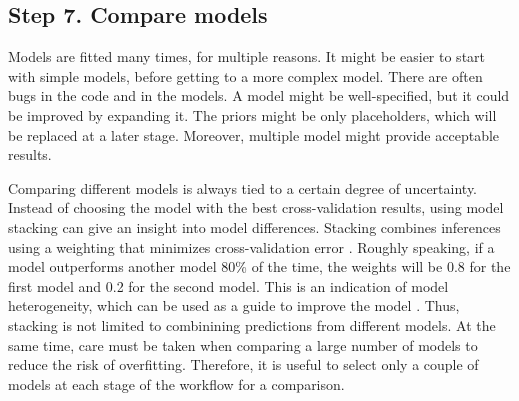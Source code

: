 \subsection{Step 7. Compare models}

Models are fitted many times, for multiple reasons.
It might be easier to start with simple models, before getting to a more complex model. There are often bugs in the code and in the models.
A model might be well-specified, but it could be improved by expanding it.
The priors might be only placeholders, which will be replaced at a later stage.
Moreover, multiple model might provide acceptable results.

Comparing different models is always tied to a certain degree of uncertainty.
Instead of choosing the model with the best cross-validation results, using model stacking can give an insight into model differences.
Stacking combines inferences using a weighting that minimizes cross-validation error .
Roughly speaking, if a model outperforms another model 80\% of the time, the weights will be 0.8 for the first model and 0.2 for the second model.
This is an indication of model heterogeneity, which can be used as a guide to improve the model \citep{yao_using_2018}.
Thus, stacking is not limited to combinining predictions from different models.
At the same time, care must be taken when comparing a large number of models to reduce the risk of overfitting.
Therefore, it is useful to select only a couple of models at each stage of the workflow for a comparison.
